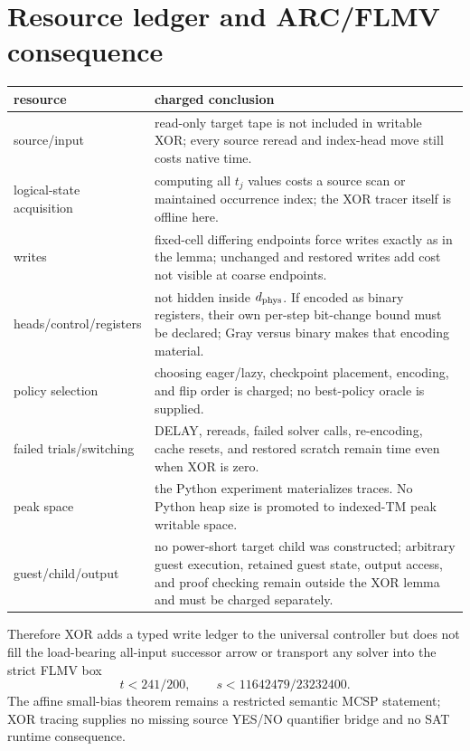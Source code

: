 \documentclass[11pt]{article}
\begin{document}
\section{Resource ledger and ARC/FLMV consequence}
\begin{center}
\begin{tabular}{p{.25\linewidth}p{.66\linewidth}}
\toprule
resource & charged conclusion\\
\midrule
source/input & read-only target tape is not included in writable XOR; every
source reread and index-head move still costs native time.\\
logical-state acquisition & computing all $t_j$ values costs a source scan or
maintained occurrence index; the XOR tracer itself is offline here.\\
writes & fixed-cell differing endpoints force writes exactly as in the lemma;
unchanged and restored writes add cost not visible at coarse endpoints.\\
heads/control/registers & not hidden inside $d_{\rm phys}$.  If encoded as
binary registers, their own per-step bit-change bound must be declared; Gray
versus binary makes that encoding material.\\
policy selection & choosing eager/lazy, checkpoint placement, encoding, and
flip order is charged; no best-policy oracle is supplied.\\
failed trials/switching & DELAY, rereads, failed solver calls, re-encoding,
cache resets, and restored scratch remain time even when XOR is zero.\\
peak space & the Python experiment materializes traces.  No Python heap size is
promoted to indexed-TM peak writable space.\\
guest/child/output & no power-short target child was constructed; arbitrary
guest execution, retained guest state, output access, and proof checking remain
outside the XOR lemma and must be charged separately.\\
\bottomrule
\end{tabular}
\end{center}
Therefore XOR adds a typed write ledger to the universal controller but does
not fill the load-bearing all-input successor arrow or transport any solver
into the strict FLMV box
\[
 t<241/200,\qquad s<11642479/23232400.
\]
The affine small-bias theorem remains a restricted semantic MCSP statement;
XOR tracing supplies no missing source YES/NO quantifier bridge and no SAT
runtime consequence.
\end{document}
